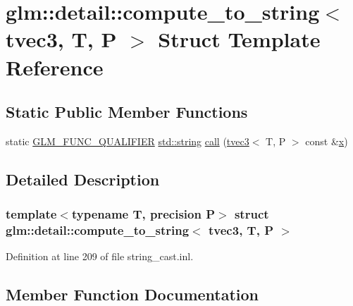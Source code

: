 \hypertarget{structglm_1_1detail_1_1compute__to__string_3_01tvec3_00_01_t_00_01_p_01_4}{}\section{glm\+::detail\+::compute\+\_\+to\+\_\+string$<$ tvec3, T, P $>$ Struct Template Reference}
\label{structglm_1_1detail_1_1compute__to__string_3_01tvec3_00_01_t_00_01_p_01_4}
\subsection*{Static Public Member Functions}
\begin{DoxyCompactItemize}
\item 
static \mbox{\hyperlink{setup_8hpp_a33fdea6f91c5f834105f7415e2a64407}{G\+L\+M\+\_\+\+F\+U\+N\+C\+\_\+\+Q\+U\+A\+L\+I\+F\+I\+ER}} \mbox{\hyperlink{glad_8h_ac83513893df92266f79a515488701770}{std\+::string}} \mbox{\hyperlink{structglm_1_1detail_1_1compute__to__string_3_01tvec3_00_01_t_00_01_p_01_4_acf3706c18e3084b171b0bcfe4ea64ffa}{call}} (\mbox{\hyperlink{structglm_1_1tvec3}{tvec3}}$<$ T, P $>$ const \&\mbox{\hyperlink{glad_8h_a92d0386e5c19fb81ea88c9f99644ab1d}{x}})
\end{DoxyCompactItemize}


\subsection{Detailed Description}
\subsubsection*{template$<$typename T, precision P$>$\newline
struct glm\+::detail\+::compute\+\_\+to\+\_\+string$<$ tvec3, T, P $>$}



Definition at line 209 of file string\+\_\+cast.\+inl.



\subsection{Member Function Documentation}
\mbox{\label{structglm_1_1detail_1_1compute__to__string_3_01tvec3_00_01_t_00_01_p_01_4_acf3706c18e3084b171b0bcfe4ea64ffa}} 
